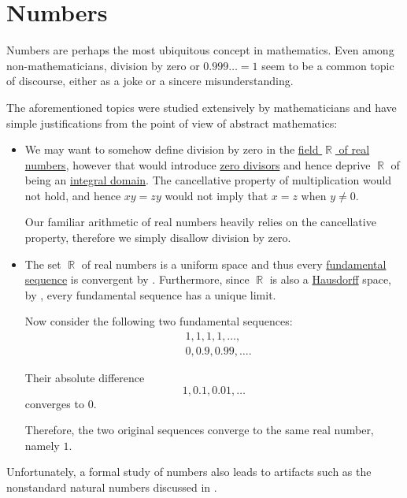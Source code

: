 \section{Numbers}\label{sec:numbers}

Numbers are perhaps the most ubiquitous concept in mathematics. Even among non-mathematicians, division by zero or \( 0.999\ldots = 1 \) seem to be a common topic of discourse, either as a joke or a sincere misunderstanding.

The aforementioned topics were studied extensively by mathematicians and have simple justifications from the point of view of abstract mathematics:
\begin{itemize}
  \item We may want to somehow define division by zero in the \hyperref[def:real_numbers]{field \( \BbbR \) of real numbers}, however that would introduce \hyperref[def:divisibility/zero]{zero divisors} and hence deprive \( \BbbR \) of being an \hyperref[def:integral_domain]{integral domain}. The cancellative property of multiplication would not hold, and hence \( xy = zy \) would not imply that \( x = z \) when \( y \neq 0 \).

  Our familiar arithmetic of real numbers heavily relies on the cancellative property, therefore we simply disallow division by zero.

  \item The set \( \BbbR \) of real numbers is a uniform space and thus every \hyperref[def:fundamental_net]{fundamental sequence} is convergent by . Furthermore, since \( \BbbR \) is also a \hyperref[def:separation_axioms/T2]{Hausdorff} space, by , every fundamental sequence has a unique limit.

  Now consider the following two fundamental sequences:
  \begin{align*}
    &1, 1, 1, 1, \ldots, \\
    &0, 0.9, 0.99, \ldots.
  \end{align*}

  Their absolute difference
  \begin{equation*}
    1, 0.1, 0.01, \ldots
  \end{equation*}
  converges to \( 0 \).

  Therefore, the two original sequences converge to the same real number, namely \( 1 \).
\end{itemize}

Unfortunately, a formal study of numbers also leads to artifacts such as the nonstandard natural numbers discussed in .


